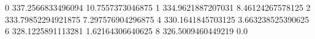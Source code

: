 0 337.2566833496094 10.7557373046875
1 334.9621887207031 8.46124267578125
2 333.79852294921875 7.297576904296875
4 330.1641845703125 3.663238525390625
6 328.1225891113281 1.62164306640625
8 326.5009460449219 0.0
